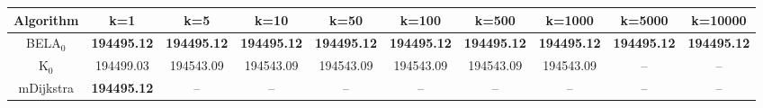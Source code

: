 \begin{tabular}{c|ccccccccc}\toprule
Algorithm & k=1 & k=5 & k=10 & k=50 & k=100 & k=500 & k=1000 & k=5000 & k=10000 \\ \midrule
BELA$_0$ & \textbf{194495.12} & \textbf{194495.12} & \textbf{194495.12} & \textbf{194495.12} & \textbf{194495.12} & \textbf{194495.12} & \textbf{194495.12} & \textbf{194495.12} & \textbf{194495.12} \\
K$_0$ & 194499.03 & 194543.09 & 194543.09 & 194543.09 & 194543.09 & 194543.09 & 194543.09 & -- & -- \\
mDijkstra & \textbf{194495.12} & -- & -- & -- & -- & -- & -- & -- & -- \\ \bottomrule 
\end{tabular}
